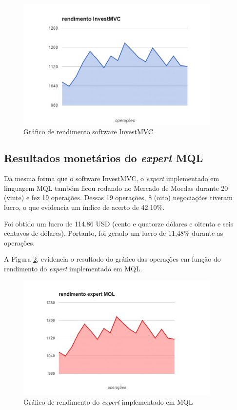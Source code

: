 \begin{figure}[H]
\centering
\includegraphics[width=0.9\textwidth]{figuras/rendimentoInvestMVC}
\caption{Gráfico de rendimento software InvestMVC}
\label{rendimentoInvestMVC}
\end{figure}

\subsection{Resultados monetários do \textit{expert} MQL}
Da mesma forma que o software InvestMVC, o \textit{expert} implementado em linguagem MQL também ficou rodando no Mercado de Moedas durante 20 (vinte) e fez 19 operações. Dessas 19 operações, 8 (oito) negociações tiveram lucro, o que evidencia um índice de acerto de 42.10\%.

Foi obtido um lucro de 114.86 USD (cento e quatorze dólares e oitenta e seis centavos de dólares). Portanto, foi gerado um lucro de 11,48\% durante as operações. 

A Figura \ref{rendimentoInvestMQL}, evidencia o resultado do gráfico das operações em função do rendimento do \textit{expert} implementado em MQL.

\begin{figure}[H]
\centering
\includegraphics[width=0.9\textwidth]{figuras/rendimentoMQL}
\caption{Gráfico de rendimento do \textit{expert} implementado em MQL}
\label{rendimentoInvestMQL}
\end{figure}

